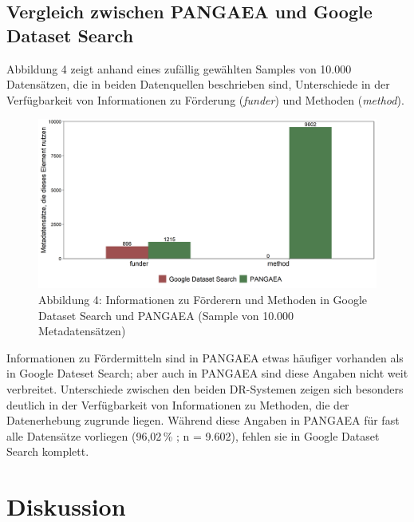 \documentclass[a4paper,
fontsize=11pt,
oneside,
numbers=noperiodatend,
parskip=half-,
bibliography=totoc,
final
]{scrartcl}
\begin{document}
\hypertarget{vergleich-zwischen-pangaea-und-google-dataset-search}{%
\subsection{Vergleich zwischen PANGAEA und Google Dataset
Search}\label{vergleich-zwischen-pangaea-und-google-dataset-search}}

Abbildung 4 zeigt anhand eines zufällig gewählten Samples von 10.000
Datensätzen, die in beiden Datenquellen beschrieben sind, Unterschiede
in der Verfügbarkeit von Informationen zu Förderung (\emph{funder}) und
Methoden (\emph{method}).

\begin{figure}[h!]
\centering
\includegraphics[width=.8\textwidth]{img/abb4_comparative_element_use.png}
\caption{Abbildung 4: Informationen zu Förderern und Methoden in Google
Dataset Search und PANGAEA (Sample von 10.000 Metadatensätzen)}
\end{figure}

Informationen zu Fördermitteln sind in PANGAEA etwas häufiger vorhanden
als in Google Dateset Search; aber auch in PANGAEA sind diese Angaben
nicht weit verbreitet. Unterschiede zwischen den beiden DR-Systemen
zeigen sich besonders deutlich in der Verfügbarkeit von Informationen zu
Methoden, die der Datenerhebung zugrunde liegen. Während diese Angaben
in PANGAEA für fast alle Datensätze vorliegen (96,02\,\% ; n = 9.602),
fehlen sie in Google Dataset Search komplett.

\hypertarget{diskussion}{%
\section{Diskussion}\label{diskussion}}
\end{document}
